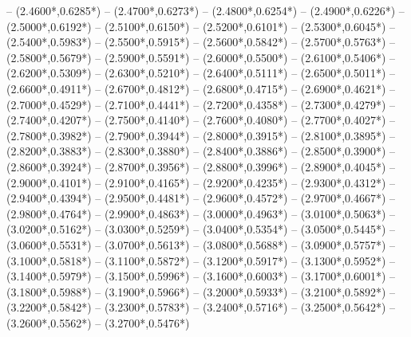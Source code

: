 {	-- ({2.4600*\dx},{0.6285*\dy})
	-- ({2.4700*\dx},{0.6273*\dy})
	-- ({2.4800*\dx},{0.6254*\dy})
	-- ({2.4900*\dx},{0.6226*\dy})
	-- ({2.5000*\dx},{0.6192*\dy})
	-- ({2.5100*\dx},{0.6150*\dy})
	-- ({2.5200*\dx},{0.6101*\dy})
	-- ({2.5300*\dx},{0.6045*\dy})
	-- ({2.5400*\dx},{0.5983*\dy})
	-- ({2.5500*\dx},{0.5915*\dy})
	-- ({2.5600*\dx},{0.5842*\dy})
	-- ({2.5700*\dx},{0.5763*\dy})
	-- ({2.5800*\dx},{0.5679*\dy})
	-- ({2.5900*\dx},{0.5591*\dy})
	-- ({2.6000*\dx},{0.5500*\dy})
	-- ({2.6100*\dx},{0.5406*\dy})
	-- ({2.6200*\dx},{0.5309*\dy})
	-- ({2.6300*\dx},{0.5210*\dy})
	-- ({2.6400*\dx},{0.5111*\dy})
	-- ({2.6500*\dx},{0.5011*\dy})
	-- ({2.6600*\dx},{0.4911*\dy})
	-- ({2.6700*\dx},{0.4812*\dy})
	-- ({2.6800*\dx},{0.4715*\dy})
	-- ({2.6900*\dx},{0.4621*\dy})
	-- ({2.7000*\dx},{0.4529*\dy})
	-- ({2.7100*\dx},{0.4441*\dy})
	-- ({2.7200*\dx},{0.4358*\dy})
	-- ({2.7300*\dx},{0.4279*\dy})
	-- ({2.7400*\dx},{0.4207*\dy})
	-- ({2.7500*\dx},{0.4140*\dy})
	-- ({2.7600*\dx},{0.4080*\dy})
	-- ({2.7700*\dx},{0.4027*\dy})
	-- ({2.7800*\dx},{0.3982*\dy})
	-- ({2.7900*\dx},{0.3944*\dy})
	-- ({2.8000*\dx},{0.3915*\dy})
	-- ({2.8100*\dx},{0.3895*\dy})
	-- ({2.8200*\dx},{0.3883*\dy})
	-- ({2.8300*\dx},{0.3880*\dy})
	-- ({2.8400*\dx},{0.3886*\dy})
	-- ({2.8500*\dx},{0.3900*\dy})
	-- ({2.8600*\dx},{0.3924*\dy})
	-- ({2.8700*\dx},{0.3956*\dy})
	-- ({2.8800*\dx},{0.3996*\dy})
	-- ({2.8900*\dx},{0.4045*\dy})
	-- ({2.9000*\dx},{0.4101*\dy})
	-- ({2.9100*\dx},{0.4165*\dy})
	-- ({2.9200*\dx},{0.4235*\dy})
	-- ({2.9300*\dx},{0.4312*\dy})
	-- ({2.9400*\dx},{0.4394*\dy})
	-- ({2.9500*\dx},{0.4481*\dy})
	-- ({2.9600*\dx},{0.4572*\dy})
	-- ({2.9700*\dx},{0.4667*\dy})
	-- ({2.9800*\dx},{0.4764*\dy})
	-- ({2.9900*\dx},{0.4863*\dy})
	-- ({3.0000*\dx},{0.4963*\dy})
	-- ({3.0100*\dx},{0.5063*\dy})
	-- ({3.0200*\dx},{0.5162*\dy})
	-- ({3.0300*\dx},{0.5259*\dy})
	-- ({3.0400*\dx},{0.5354*\dy})
	-- ({3.0500*\dx},{0.5445*\dy})
	-- ({3.0600*\dx},{0.5531*\dy})
	-- ({3.0700*\dx},{0.5613*\dy})
	-- ({3.0800*\dx},{0.5688*\dy})
	-- ({3.0900*\dx},{0.5757*\dy})
	-- ({3.1000*\dx},{0.5818*\dy})
	-- ({3.1100*\dx},{0.5872*\dy})
	-- ({3.1200*\dx},{0.5917*\dy})
	-- ({3.1300*\dx},{0.5952*\dy})
	-- ({3.1400*\dx},{0.5979*\dy})
	-- ({3.1500*\dx},{0.5996*\dy})
	-- ({3.1600*\dx},{0.6003*\dy})
	-- ({3.1700*\dx},{0.6001*\dy})
	-- ({3.1800*\dx},{0.5988*\dy})
	-- ({3.1900*\dx},{0.5966*\dy})
	-- ({3.2000*\dx},{0.5933*\dy})
	-- ({3.2100*\dx},{0.5892*\dy})
	-- ({3.2200*\dx},{0.5842*\dy})
	-- ({3.2300*\dx},{0.5783*\dy})
	-- ({3.2400*\dx},{0.5716*\dy})
	-- ({3.2500*\dx},{0.5642*\dy})
	-- ({3.2600*\dx},{0.5562*\dy})
	-- ({3.2700*\dx},{0.5476*\dy})
}
